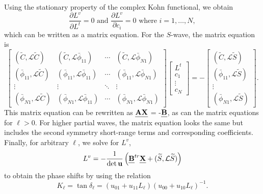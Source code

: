 \documentclass[preprint,showpacs,showkeys,preprintnumbers,amsmath,amssymb,longbibliography,pra,aps]{revtex4-1}
\begin{document}
Using the stationary property of the complex Kohn functional, we obtain
\begin{equation}
\frac{\partial L^v}{\partial L^t} = 0  \text{ and }
  \frac{\partial L^v}{\partial c_i} = 0 \text{ where $i = 1,\ldots,N$},
\label{eq:ComplexKohnStationary}
\end{equation}
which can be written as a matrix equation. For the $S$-wave, the matrix
equation is
\begin{equation}
\label{eq:ComplexKohnMatrix}
\begin{bmatrix} 
 (\widetilde{C},\mathcal{L}\widetilde{C}) & (\widetilde{C},\mathcal{L}\bar{\phi}_{11}) & \cdots & (\widetilde{C},\mathcal{L}\bar{\phi}_{N1})\\
 (\bar{\phi}_{11},\mathcal{L}\widetilde{C}) & (\bar{\phi}_{11},\mathcal{L}\bar{\phi}_{11}) & \cdots & (\bar{\phi}_{11},\mathcal{L}\bar{\phi}_{N1})\\
 \vdots & \vdots & \ddots & \vdots \\
 (\bar{\phi}_{N1},\mathcal{L}\widetilde{C}) & (\bar{\phi}_{N1},\mathcal{L}\bar{\phi}_{11}) & \cdots & (\bar{\phi}_{N1},\mathcal{L}\bar{\phi}_{N1})
\end{bmatrix}
\begin{bmatrix}
L^t\\
c_1\\
\vdots\\
c_N
\end{bmatrix}
= -
\begin{bmatrix}
(\widetilde{C},\mathcal{L}\widetilde{S}) \\
(\bar{\phi}_{11},\mathcal{L}\widetilde{S}) \\
\vdots \\
(\bar{\phi}_{N1},\mathcal{L}\widetilde{S})
\end{bmatrix}.
\end{equation}
This matrix equation can be rewritten as
$\textbf{\emph{AX}}$ = -$\textbf{\emph{B}}$, as can the matrix equations
for $\ell > 0$. For higher partial waves,
the matrix equation looks the same but includes the second symmetry
short-range terms and corresponding coefficients. Finally, for arbitrary
$\ell$, we solve for $L^v$,
\begin{equation}
L^v = -\frac{1}{\det \textbf{u}} \left( \textbf{\emph{B}}^{tr} \textbf{\emph{X}} +
  (\widetilde{S},\mathcal{L} \widetilde{S}) \right)
\end{equation}
to obtain the phase shifts by using the relation \cite{Lucchese1989}
\begin{equation}
\label{eq:GenKohnL}
K_\ell = \tan \delta_\ell = (u_{01} + u_{11} L_\ell)(u_{00} + u_{10}
  L_\ell)^{-1}.
\end{equation}
\end{document}
